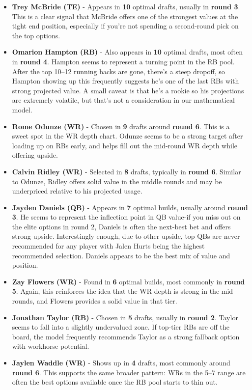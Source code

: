 \documentclass{article}
\begin{document}
\begin{itemize}
  \item \textbf{Trey McBride (TE)} - Appears in \textbf{10} optimal drafts, usually in \textbf{round 3}. This is a clear signal that McBride offers one of the strongest values at the tight end position, especially if you're not spending a second-round pick on the top options.
  \item \textbf{Omarion Hampton (RB)} - Also appears in \textbf{10} optimal drafts, most often in \textbf{round 4}. Hampton seems to represent a turning point in the RB pool. After the top 10–12 running backs are gone, there's a steep dropoff, so Hampton showing up this frequently suggests he's one of the last RBs with strong projected value. A small caveat is that he's a rookie so his projections are extremely volatile, but that's not a consideration in our mathematical model.
  \item \textbf{Rome Odunze (WR)} - Chosen in \textbf{9} drafts around \textbf{round 6}. This is a sweet spot in the WR depth chart. Odunze seems to be a strong target after loading up on RBs early, and helps fill out the mid-round WR depth while offering upside.
  \item \textbf{Calvin Ridley (WR)} - Selected in \textbf{8} drafts, typically in \textbf{round 6}. Similar to Odunze, Ridley offers solid value in the middle rounds and may be underpriced relative to his projected usage.
  \item \textbf{Jayden Daniels (QB)} - Appears in \textbf{7} optimal builds, usually around \textbf{round 3}. He seems to represent the inflection point in QB value-if you miss out on the elite options in round 2, Daniels is often the next-best bet and offers strong upside. Interestingly enough, due to other upside, top QBs are never recommended for any player with Jalen Hurts being the highest recommended selection.  Daniels appears to be the best mix of value and position.
  \item \textbf{Zay Flowers (WR)} - Found in \textbf{6} optimal builds, most commonly in \textbf{round 5}. Again, this reinforces the idea that the WR depth is strong in the mid rounds, and Flowers provides a solid value in that tier.
  \item \textbf{Jonathan Taylor (RB)} - Chosen in \textbf{5} drafts, usually in \textbf{round 2}. Taylor seems to fall into a slightly undervalued zone. If top-tier RBs are off the board, the model frequently recommends Taylor as a strong fallback option with workhorse potential.
  \item \textbf{Jaylen Waddle (WR)} - Shows up in \textbf{4} drafts, most commonly around \textbf{round 6}. This supports the same broader pattern: WRs in the 5–7 range are often the best options available once the RB pool starts to thin out.
\end{itemize}
\end{document}
